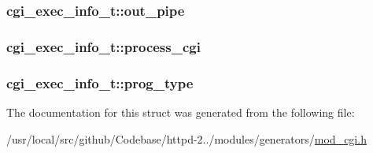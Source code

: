 \subsubsection[{\texorpdfstring{out\+\_\+pipe}{out_pipe}}]{ cgi\+\_\+exec\+\_\+info\+\_\+t\+::out\+\_\+pipe}\hypertarget{structcgi__exec__info__t_a8aa574128e14469e3721259ebd1a5a60}{}\label{structcgi__exec__info__t_a8aa574128e14469e3721259ebd1a5a60}
\subsubsection[{\texorpdfstring{process\+\_\+cgi}{process_cgi}}]{ cgi\+\_\+exec\+\_\+info\+\_\+t\+::process\+\_\+cgi}\hypertarget{structcgi__exec__info__t_a32e63ff53d02e16460801c97a0033ad9}{}\label{structcgi__exec__info__t_a32e63ff53d02e16460801c97a0033ad9}
\subsubsection[{\texorpdfstring{prog\+\_\+type}{prog_type}}]{ cgi\+\_\+exec\+\_\+info\+\_\+t\+::prog\+\_\+type}\hypertarget{structcgi__exec__info__t_aedc6344f6930961a65c52cc1de6aec8b}{}\label{structcgi__exec__info__t_aedc6344f6930961a65c52cc1de6aec8b}


The documentation for this struct was generated from the following file\+:\begin{DoxyCompactItemize}
\item 
/usr/local/src/github/\+Codebase/httpd-\/2../modules/generators/\hyperlink{mod__cgi_8h}{mod\+\_\+cgi.\+h}\end{DoxyCompactItemize}
